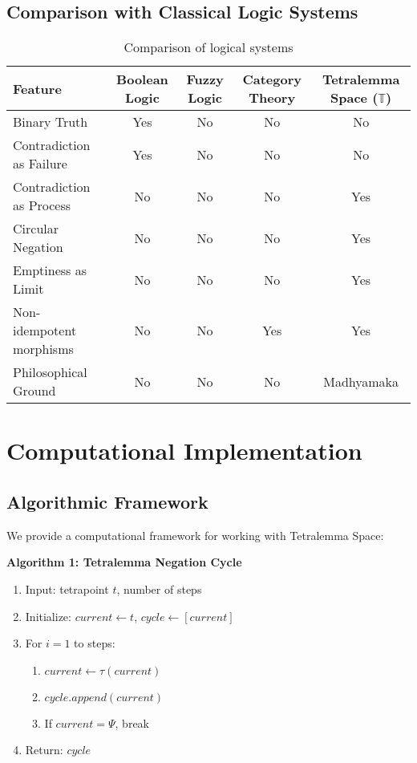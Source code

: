 \documentclass[11pt,a4paper]{article}
\begin{document}
\subsection{Comparison with Classical Logic Systems}

\begin{table}[H]
\centering
\begin{tabular}{|l|c|c|c|c|}
\hline
\textbf{Feature} & \textbf{Boolean Logic} & \textbf{Fuzzy Logic} & \textbf{Category Theory} & \textbf{Tetralemma Space ($\mathbb{T}$)} \\
\hline
Binary Truth & Yes & No & No & No \\
\hline
Contradiction as Failure & Yes & No & No & No \\
\hline
Contradiction as Process & No & No & No & Yes \\
\hline
Circular Negation & No & No & No & Yes \\
\hline
Emptiness as Limit & No & No & No & Yes \\
\hline
Non-idempotent morphisms & No & No & Yes & Yes \\
\hline
Philosophical Ground & No & No & No & Madhyamaka \\
\hline
\end{tabular}
\caption{Comparison of logical systems}
\end{table}

\section{Computational Implementation}

\subsection{Algorithmic Framework}

We provide a computational framework for working with Tetralemma Space:

\textbf{Algorithm 1: Tetralemma Negation Cycle}
\begin{enumerate}
\item Input: tetrapoint $t$, number of steps
\item Initialize: $current \leftarrow t$, $cycle \leftarrow [current]$
\item For $i = 1$ to steps:
    \begin{enumerate}
    \item $current \leftarrow \tau(current)$
    \item $cycle.append(current)$
    \item If $current = \Psi$, break
    \end{enumerate}
\item Return: $cycle$
\end{enumerate}
\end{document}
